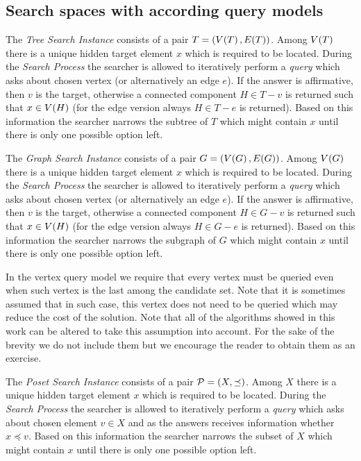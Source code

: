 \subsection{Search spaces with according query models}

The \textit{Tree Search Instance} consists of a pair $T=\mathopen{}\left( V\mathopen{}\left( T \right),E\mathopen{}\left( T \right) \right)$. Among $V\mathopen{}\left( T \right)$ there is a unique hidden target element $x$ which is required
to be located. During the \textit{Search Process} the searcher is allowed to iteratively perform a \textit{query} which asks about chosen vertex (or alternatively an edge $e$). If the answer is affirmative, then $v$ is the target, otherwise a connected component $H\in T-v$ is returned such that $x\in V\mathopen{}\left( H \right)$ (for the edge version always $H\in T-e$ is returned). Based on this information the searcher narrows the subtree of $T$ which might contain $x$ until there is only one possible option left.

The \textit{Graph Search Instance} consists of a pair $G=\mathopen{}\left( V\mathopen{}\left( G \right),E\mathopen{}\left( G \right) \right)$. Among $V\mathopen{}\left( G \right)$ there is a unique hidden target element $x$ which is required
to be located. During the \textit{Search Process} the searcher is allowed to iteratively perform a \textit{query} which asks about chosen vertex (or alternatively an edge $e$). If the answer is affirmative, then $v$ is the target, otherwise a connected component $H\in G-v$ is returned such that $x\in V\mathopen{}\left( H \right)$ (for the edge version always $H\in G-e$ is returned). Based on this information the searcher narrows the subgraph of $G$ which might contain $x$ until there is only one possible option left. 

\begin{remark}
    In the vertex query model we require that every vertex must be queried even when such vertex is the last among the candidate set. Note that it is sometimes assumed that in such case, this vertex does not need to be queried which may reduce the cost of the solution. Note that all of the algorithms showed in this work can be altered to take this assumption into account. For the sake of the brevity we do not include them but we encourage the reader to obtain them as an exercise.
\end{remark} 

The \textit{Poset Search Instance} consists of a pair $\mathcal{P}=\mathopen{}\left( X, \preceq \right)$. Among $X$ there is a unique hidden target element $x$ which is required
to be located. During the \textit{Search Process} the searcher is allowed to iteratively perform a \textit{query} which asks about chosen element $v\in X$ and as the answers receives information whether $x\preceq v$. Based on this information the searcher narrows the subset of $X$ which might contain $x$ until there is only one possible option left.

